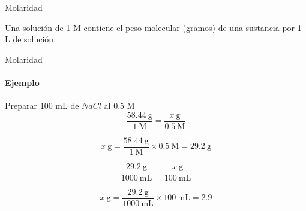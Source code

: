 \documentclass[12pt, aspectratio=169]{beamer}
\begin{document}
\begin{frame}{Molaridad}
	
	Una soluci\'on de 1 M contiene el peso molecular (gramos) de una sustancia por 1 L de soluci\'on.
		
\end{frame}

\begin{frame}{Molaridad}
	\framesubtitle{Ejemplo}
	
	Preparar 100 mL de $NaCl$ al 0.5 M
	$$\frac{58.44 ~\text{g}}{ 1 ~\text{M}} = \frac{x ~\text{g}}{0.5 ~\text{M}}$$
	
	$$x ~\text{g} = \frac{58.44 ~\text{g}}{ 1 ~\text{M}} \times 0.5~\text{M} = 29.2 ~\text{g}$$
	
	$$\frac{29.2~\text{g}}{1000 ~\text{mL}} = \frac{x ~\text{g}}{100 ~\text{mL}}$$
	
	$$x ~\text{g} = \frac{29.2~\text{g}}{1000 ~\text{mL}} \times 100 ~\text{mL} = 2.9$$
			
\end{frame}
\end{document}
